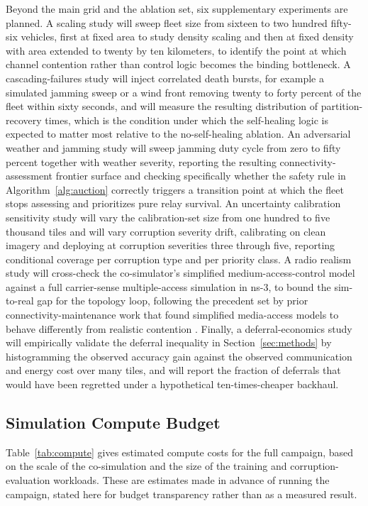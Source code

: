 \documentclass[drones,article,submit,moreauthors]{Definitions/mdpi}
\begin{document}
Beyond the main grid and the ablation set, six supplementary experiments are planned. A scaling study will sweep fleet size from sixteen to two hundred fifty-six vehicles, first at fixed area to study density scaling and then at fixed density with area extended to twenty by ten kilometers, to identify the point at which channel contention rather than control logic becomes the binding bottleneck. A cascading-failures study will inject correlated death bursts, for example a simulated jamming sweep or a wind front removing twenty to forty percent of the fleet within sixty seconds, and will measure the resulting distribution of partition-recovery times, which is the condition under which the self-healing logic is expected to matter most relative to the no-self-healing ablation. An adversarial weather and jamming study will sweep jamming duty cycle from zero to fifty percent together with weather severity, reporting the resulting connectivity-assessment frontier surface and checking specifically whether the safety rule in Algorithm~\ref{alg:auction} correctly triggers a transition point at which the fleet stops assessing and prioritizes pure relay survival. An uncertainty calibration sensitivity study will vary the calibration-set size from one hundred to five thousand tiles and will vary corruption severity drift, calibrating on clean imagery and deploying at corruption severities three through five, reporting conditional coverage per corruption type and per priority class. A radio realism study will cross-check the co-simulator's simplified medium-access-control model against a full carrier-sense multiple-access simulation in ns-3, to bound the sim-to-real gap for the topology loop, following the precedent set by prior connectivity-maintenance work that found simplified media-access models to behave differently from realistic contention \cite{li2023selfhealing}. Finally, a deferral-economics study will empirically validate the deferral inequality in Section~\ref{sec:methods} by histogramming the observed accuracy gain against the observed communication and energy cost over many tiles, and will report the fraction of deferrals that would have been regretted under a hypothetical ten-times-cheaper backhaul.

\subsection{Simulation Compute Budget}

Table~\ref{tab:compute} gives estimated compute costs for the full campaign, based on the scale of the co-simulation and the size of the training and corruption-evaluation workloads. These are estimates made in advance of running the campaign, stated here for budget transparency rather than as a measured result.
\end{document}
